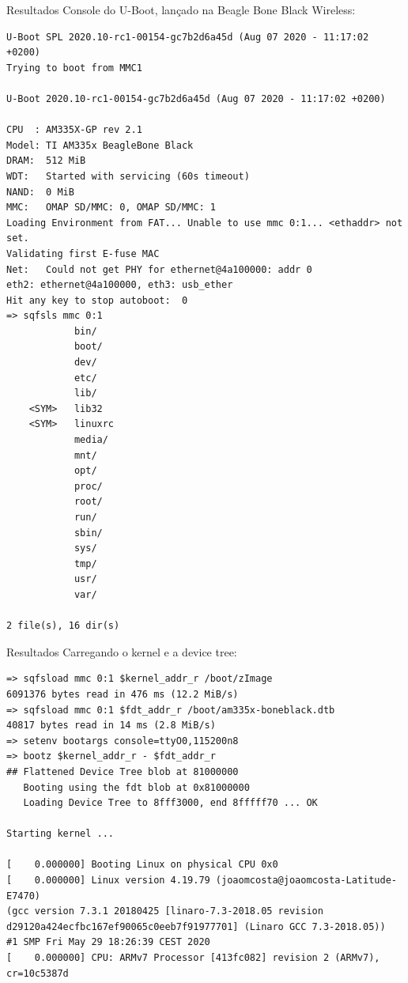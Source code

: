 \begin{frame}[fragile]{Resultados}
Console do U-Boot, lançado na Beagle Bone Black Wireless:
\begin{verbatim}
U-Boot SPL 2020.10-rc1-00154-gc7b2d6a45d (Aug 07 2020 - 11:17:02 +0200)
Trying to boot from MMC1

U-Boot 2020.10-rc1-00154-gc7b2d6a45d (Aug 07 2020 - 11:17:02 +0200)

CPU  : AM335X-GP rev 2.1
Model: TI AM335x BeagleBone Black
DRAM:  512 MiB
WDT:   Started with servicing (60s timeout)
NAND:  0 MiB
MMC:   OMAP SD/MMC: 0, OMAP SD/MMC: 1
Loading Environment from FAT... Unable to use mmc 0:1... <ethaddr> not set.
Validating first E-fuse MAC
Net:   Could not get PHY for ethernet@4a100000: addr 0
eth2: ethernet@4a100000, eth3: usb_ether
Hit any key to stop autoboot:  0
=> sqfsls mmc 0:1
            bin/
            boot/
            dev/
            etc/
            lib/
    <SYM>   lib32
    <SYM>   linuxrc
            media/
            mnt/
            opt/
            proc/
            root/
            run/
            sbin/
            sys/
            tmp/
            usr/
            var/

2 file(s), 16 dir(s)
\end{verbatim}
\end{frame}

\begin{frame}[fragile]{Resultados}
Carregando o kernel e a device tree:
\begin{verbatim}
=> sqfsload mmc 0:1 $kernel_addr_r /boot/zImage
6091376 bytes read in 476 ms (12.2 MiB/s)
=> sqfsload mmc 0:1 $fdt_addr_r /boot/am335x-boneblack.dtb
40817 bytes read in 14 ms (2.8 MiB/s)
=> setenv bootargs console=ttyO0,115200n8
=> bootz $kernel_addr_r - $fdt_addr_r
## Flattened Device Tree blob at 81000000
   Booting using the fdt blob at 0x81000000
   Loading Device Tree to 8fff3000, end 8fffff70 ... OK

Starting kernel ...

[    0.000000] Booting Linux on physical CPU 0x0
[    0.000000] Linux version 4.19.79 (joaomcosta@joaomcosta-Latitude-E7470)
(gcc version 7.3.1 20180425 [linaro-7.3-2018.05 revision
d29120a424ecfbc167ef90065c0eeb7f91977701] (Linaro GCC 7.3-2018.05))
#1 SMP Fri May 29 18:26:39 CEST 2020
[    0.000000] CPU: ARMv7 Processor [413fc082] revision 2 (ARMv7), cr=10c5387d
\end{verbatim}
\end{frame}


